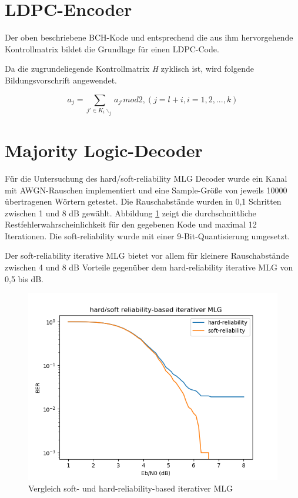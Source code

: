 \documentclass[11pt,a4paper]{article}
\begin{document}
	

\section{LDPC-Encoder}
Der oben beschriebene BCH-Kode und entsprechend die aus ihm hervorgehende Kontrollmatrix bildet die Grundlage für einen LDPC-Code.

Da die zugrundeliegende Kontrollmatrix \textit{H} zyklisch ist, wird folgende Bildungsvorschrift angewendet.

\[ a_{j} = \sum_{j′∈K_{i}\backslash_{j}} a_{j′}  mod  2 , (j = l + i, i = 1, 2, ..., k)  \]

\section{Majority Logic-Decoder}

Für die Untersuchung des hard/soft-reliability MLG Decoder wurde ein Kanal mit AWGN-Rauschen implementiert und eine Sample-Größe von jeweils 10000 übertragenen Wörtern getestet.
Die Rauschabstände wurden in 0,1 Schritten zwischen 1 und 8 dB gewählt. Abbildung \ref{fig:plot} zeigt die durchschnittliche Restfehlerwahrscheinlichkeit für den gegebenen Kode und maximal 12 Iterationen. Die soft-reliability wurde mit einer 9-Bit-Quantisierung umgesetzt. 

Der soft-reliability iterative MLG bietet vor allem für kleinere Rauschabstände zwischen 4 und 8 dB Vorteile gegenüber dem hard-reliability iterative MLG von 0,5 bis dB. 

\begin{figure}[hb]
	\includegraphics[width=\linewidth]{foo.png}
	\caption{Vergleich soft- und hard-reliability-based iterativer MLG}
	\label{fig:plot}
\end{figure}
\end{document}
